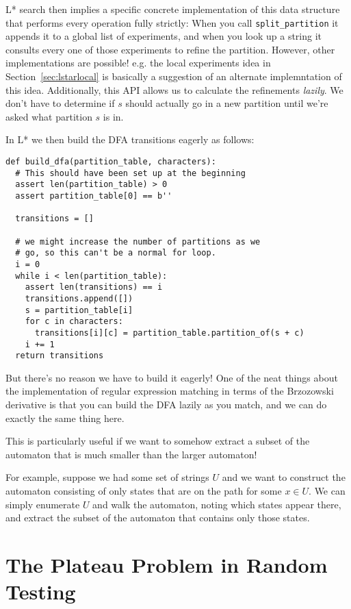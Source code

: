\documentclass[a4paper]{book}
\begin{document}
L* search then implies a specific concrete implementation of this data structure that performs every operation fully strictly:
When you call \texttt{split\_partition} it appends it to a global list of experiments,
and when you look up a string it consults every one of those experiments to refine the partition.
However, other implementations are possible!
e.g. the local experiments idea in Section~\ref{sec:lstarlocal} is basically a suggestion of an alternate implemntation of this idea.
Additionally,
this API allows us to calculate the refinements \emph{lazily}.
We don't have to determine if \(s\) should actually go in a new partition until we're asked what partition \(s\) is in.

In L* we then build the DFA transitions eagerly as follows:

\begin{lstlisting}
def build_dfa(partition_table, characters):
  # This should have been set up at the beginning
  assert len(partition_table) > 0
  assert partition_table[0] == b''

  transitions = []

  # we might increase the number of partitions as we
  # go, so this can't be a normal for loop.
  i = 0  
  while i < len(partition_table):
    assert len(transitions) == i
    transitions.append([])
    s = partition_table[i]
    for c in characters:
      transitions[i][c] = partition_table.partition_of(s + c)
    i += 1
  return transitions
\end{lstlisting}

But there's no reason we have to build it eagerly!
One of the neat things about the implementation of regular expression matching in terms of the Brzozowski derivative is that you can build the DFA lazily as you match,
and we can do exactly the same thing here.

This is particularly useful if we want to somehow extract a subset of the automaton that is much smaller than the larger automaton!

For example,
suppose we had some set of strings \(U\) and we want to construct the automaton consisting of only states that are on the path for some \(x \in U\).
We can simply enumerate \(U\) and walk the automaton,
noting which states appear there,
and extract the subset of the automaton that contains only those states.

\chapter{The Plateau Problem in Random Testing}
\end{document}
